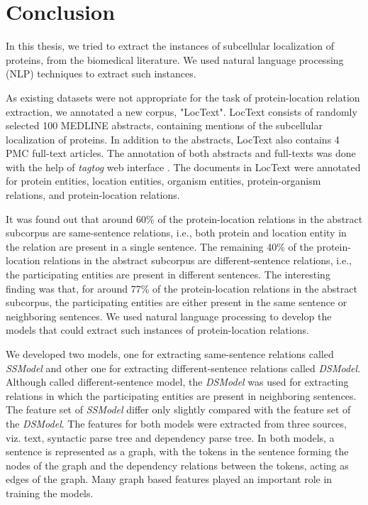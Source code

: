 \chapter{Conclusion}\label{chapter:conclusion}

In this thesis, we tried to extract the instances of subcellular localization of proteins, from the biomedical literature. We used natural language processing (NLP) techniques to extract such instances.

As existing datasets were not appropriate for the task of protein-location relation extraction, we annotated a new corpus, "LocText". LocText consists of randomly selected 100 MEDLINE \cite{medline} abstracts, containing mentions of the subcellular localization of proteins. In addition to the abstracts, LocText also contains 4 PMC \cite{pmc} full-text articles. The annotation of both abstracts and full-texts was done with the help of \textit{tagtog} web interface \cite{cejuela2014tagtog}.  The documents in LocText were annotated for protein entities, location entities, organism entities, protein-organism relations, and protein-location relations.

It was found out that around 60\% of the protein-location relations in the abstract subcorpus are same-sentence relations, i.e., both protein and location entity in the relation are present in a single sentence. The remaining 40\% of the protein-location relations in the abstract subcorpus are different-sentence relations, i.e., the participating entities are present in different sentences. The interesting finding was that, for around 77\% of the protein-location relations in the abstract subcorpus, the participating entities are either present in the same sentence or neighboring sentences. We used natural language processing to develop the models that could extract such instances of protein-location relations.

We developed two models, one for extracting same-sentence relations called \textit{SSModel} and other one for extracting different-sentence relations called \textit{DSModel}. Although called different-sentence model, the \textit{DSModel} was used for extracting relations in which the participating entities are present in neighboring sentences. The feature set of \textit{SSModel} differ only slightly compared with the feature set of the \textit{DSModel}. The features for both models were extracted from three sources, viz. text, syntactic parse tree and dependency parse tree. In both models, a sentence is represented as a graph, with the tokens in the sentence forming the nodes of the graph and the dependency relations between the tokens, acting as edges of the graph. Many graph based features played an important role in training the models.

